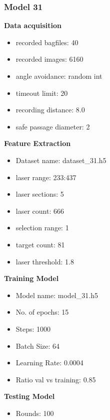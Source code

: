 \subsubsection{Model 31\label{model_31} }
\begin{multicols}{2}\textbf{Data acquisition}
\begin{itemize}
\setlength\itemsep{0.1em}
\item recorded bagfiles: 40
\item recorded images: 6160
\item angle avoidance: random int
\item timeout limit: 20
\item recording distance: 8.0
\item safe passage diameter: 2
\end{itemize}
\textbf{Feature Extraction}
\begin{itemize}
\setlength\itemsep{0.1em}
\item Dataset name: dataset\_31.h5
\item  laser range: 233:437
\item  laser sections: 5
\item  laser count: 666
\item  selection range: 1
\item  target count: 81
\item  laser threshold: 1.8
\end{itemize}
\columnbreak\textbf{Training Model}
\begin{itemize}
\setlength\itemsep{0.1em}
\item  Model name: model\_31.h5
\item  No. of epochs: 15
\item  Steps: 1000
\item  Batch Size: 64
\item  Learning Rate: 0.0004
\item  Ratio val vs training: 0.85
\end{itemize}
\textbf{Testing Model}
\begin{itemize}
\setlength\itemsep{0.1em}
\item Rounds: 100
\newline
\newline
\newline
\newline
\newline
\newline
\newline
\newline

\end{itemize}
\end{multicols}
